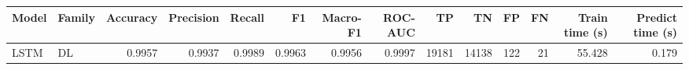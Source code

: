 \begin{tabular}{llrrrrrrrrrrrr}
\toprule
Model & Family & Accuracy & Precision & Recall & F1 & Macro-F1 & ROC-AUC & TP & TN & FP & FN & Train time (s) & Predict time (s) \\
\midrule
LSTM & DL & 0.9957 & 0.9937 & 0.9989 & 0.9963 & 0.9956 & 0.9997 & 19181 & 14138 & 122 & 21 & 55.428 & 0.179 \\
\bottomrule
\end{tabular}

